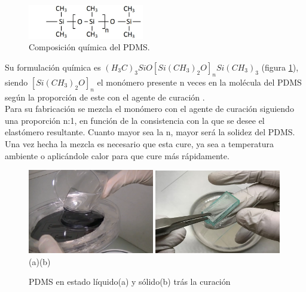 \begin{itemize}
	\begin{figure}[H]
		\centering
		\includegraphics[width=0.45\textwidth]{./img/compPDMS}
		\caption{Composición química del PDMS. \cite{nedomaPDMS}} 
		\label{fig:compFBG}
	\end{figure}
	
	Su formulación química es $(H_{3}C)_{3}SiO[Si(CH_{3})_{2}O]_{n}Si(CH_{3})_{3}$ (figura \ref{fig:compFBG}), siendo $[Si(CH_{3})_{2}O]_{n}$ el monómero presente n veces en la molécula del PDMS según la proporción de este con el agente de curación \cite{propPDMS}. \\ 
	Para su fabricación se mezcla el monómero con el agente de curación siguiendo una proporción n:1, en función de la consistencia con la que se desee el elastómero resultante. Cuanto mayor sea la n, mayor será la solidez del PDMS. Una vez hecha la mezcla es necesario que esta cure, ya sea a temperatura ambiente o aplicándole calor para que cure más rápidamente.
	
	\begin{figure}[H]
		\centering
		\includegraphics[width=0.49\textwidth]{./img/liquidPDMS}
		\includegraphics[width=0.49\textwidth]{./img/solidPDMS} 
		\\(a)\hspace{7cm}(b)
		\caption{PDMS en estado líquido(a) \cite{liquidoPDMS} y sólido(b) trás la curación \cite{solidoPDMS}} 
		\label{fig:slPDSM2}
	\end{figure}
	

\end{itemize}
